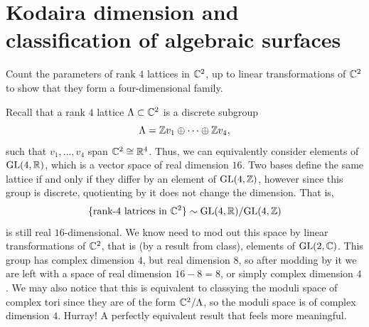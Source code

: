 \documentclass[11pt, a4paper]{article}
\begin{document}
\newpage

\section{Kodaira dimension and classification of algebraic surfaces}

\begin{exercise}
  Count the parameters of rank $4$ lattices in $\mathbb{C}^2$,
  up to linear transformations of $\mathbb{C}^2$ to show that they form a
  four-dimensional family.
\end{exercise}
\begin{solution}
  Recall that a rank $4$ lattice $\Lambda \subset \mathbb{C}^2$ is a discrete subgroup
  \[
    \Lambda = \mathbb{Z} v_1 \oplus \cdots \oplus \mathbb{Z} v_4,
  \]
  such that $v_1,\dots,v_4$ span $\mathbb{C}^2 \cong \mathbb{R}^4$. 
  Thus, we can equivalently consider elements of $\mathrm{GL}(4,\mathbb{R})$,
  which is a vector space of real dimension $16$. 
  Two bases define the same lattice if and only if they differ by
  an element of $\mathrm{GL}(4,\mathbb{Z})$, however since this group is discrete,
  quotienting by it does not change the dimension. 
  That is,
  \[
    \{\text{rank-$4$ latrices in $\mathbb{C}^2$}\} \sim \mathrm{GL}(4,\mathbb{R}) / \mathrm{GL}(4,\mathbb{Z})
  \]
  is still real $16$-dimensional. 
  We know need to mod out this space by linear transformations of $\mathbb{C}^2$,
  that is (by a result from class), elements of $\mathrm{GL}(2,\mathbb{C})$. 
  This group has complex dimension $4$, but real dimension $8$,
  so after modding by it we are left with a space of real 
  dimension $16 - 8 = 8$, or simply complex dimension $4$.
  We may also notice that this is equivalent to classying the moduli space
  of complex tori since they are of the form $\mathbb{C}^2 / \Lambda$,
  so the moduli space is of complex dimension $4$. Hurray!
  A perfectly equivalent result that feels more meaningful.
\end{solution}
\end{document}
